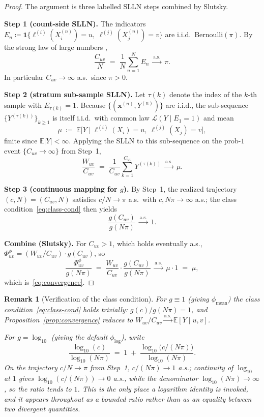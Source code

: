 \documentclass[11pt]{article}
\newtheorem{remark}{Remark}
\begin{document}
\begin{proof}
The argument is three labelled SLLN steps combined by Slutsky.

\textbf{Step 1 (count-side SLLN).}
The indicators $E_n \coloneqq \mathbf{1}\{\ell^{(i)}(X_i^{(n)}) = u,\; \ell^{(j)}(X_j^{(n)}) = v\}$ are i.i.d.\ Bernoulli$(\pi)$. By the strong law of large numbers \cite[Thm.~2.4.1]{Durrett2019},
\[
  \frac{C_{uv}}{N} \;=\; \frac{1}{N}\sum_{n=1}^{N} E_n \;\xrightarrow{\mathrm{a.s.}}\; \pi.
\]
In particular $C_{uv} \to \infty$ a.s.\ since $\pi > 0$.

\textbf{Step 2 (stratum sub-sample SLLN).}
Let $\tau(k)$ denote the index of the $k$-th sample with $E_{\tau(k)} = 1$. Because $\{(\bm{x}^{(n)}, Y^{(n)})\}$ are i.i.d., the sub-sequence $\{Y^{(\tau(k))}\}_{k \ge 1}$ is itself i.i.d.\ with common law $\mathcal{L}(Y \mid E_1 = 1)$ and mean
\[
  \mu \;\coloneqq\; \mathbb{E}\!\bigl[Y \mid \ell^{(i)}(X_i) = u,\; \ell^{(j)}(X_j) = v\bigr],
\]
finite since $\mathbb{E}|Y| < \infty$. Applying the SLLN \cite[Thm.~2.4.1]{Durrett2019} to this sub-sequence on the prob-$1$ event $\{C_{uv} \to \infty\}$ from Step~1,
\[
  \frac{W_{uv}}{C_{uv}} \;=\; \frac{1}{C_{uv}}\sum_{k=1}^{C_{uv}} Y^{(\tau(k))}
  \;\xrightarrow{\mathrm{a.s.}}\; \mu.
\]

\textbf{Step 3 (continuous mapping for $g$).}
By Step~1, the realized trajectory $(c, N) = (C_{uv}, N)$ satisfies $c/N \to \pi$ a.s.\ with $c, N\pi \to \infty$ a.s.; the class condition~\eqref{eq:class-cond} then yields
\[
  \frac{g(C_{uv})}{g(N\pi)} \;\xrightarrow{\mathrm{a.s.}}\; 1.
\]

\textbf{Combine (Slutsky).}
For $C_{uv} > 1$, which holds eventually a.s., $\Phi^\phi_{uv} = (W_{uv}/C_{uv}) \cdot g(C_{uv})$, so
\[
  \frac{\Phi^\phi_{uv}}{g(N\pi)}
  \;=\; \frac{W_{uv}}{C_{uv}} \cdot \frac{g(C_{uv})}{g(N\pi)}
  \;\xrightarrow{\mathrm{a.s.}}\; \mu \cdot 1 \;=\; \mu,
\]
which is~\eqref{eq:convergence}.
\end{proof}

\begin{remark}[Verification of the class condition]
\label{rem:class-cond}
For $g \equiv 1$ (giving $\phi_{\mathrm{mean}}$) the class condition~\eqref{eq:class-cond} holds trivially: $g(c)/g(N\pi) = 1$, and Proposition~\ref{prop:convergence} reduces to $W_{uv}/C_{uv} \xrightarrow{\mathrm{a.s.}} \mathbb{E}[Y \mid u,v]$.

For $g = \log_{10}$ (giving the default $\phi_{\log}$), write
\[
  \frac{\log_{10}(c)}{\log_{10}(N\pi)}
  \;=\; 1 \;+\; \frac{\log_{10}\!\bigl(c / (N\pi)\bigr)}{\log_{10}(N\pi)}.
\]
On the trajectory $c/N \to \pi$ from Step~1, $c/(N\pi) \to 1$ a.s.; continuity of $\log_{10}$ at $1$ gives $\log_{10}(c/(N\pi)) \to 0$ a.s., while the denominator $\log_{10}(N\pi) \to \infty$, so the ratio tends to $1$. This is the \emph{only} place a logarithm identity is invoked, and it appears throughout as a bounded ratio rather than as an equality between two divergent quantities.
\end{remark}
\end{document}

